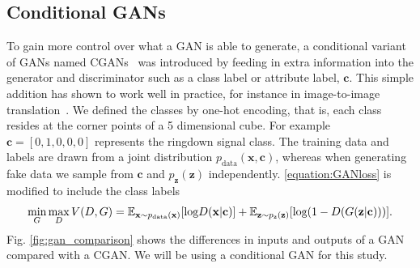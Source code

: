 \documentclass[12pt]{iopart}
\begin{document}
\subsection{Conditional GANs}

%
To gain more control over what a GAN is able to generate, a conditional variant
of \acp{GAN} named \acp{CGAN}~\cite{cgan} was introduced by feeding in extra
information into the generator and discriminator such as a class label or
attribute label, $\mathbf{c}$. This simple addition has shown to work well in practice, for instance in image-to-image translation~\cite{isola2016imagetoimage}. We defined the classes by one-hot encoding, that is, each class resides at the corner points of a 5 dimensional cube. For example $\mathbf{c}=[0,1,0,0,0]$ represents the ringdown signal class. The training data and labels are drawn from a joint distribution $p_{\text{data}}(\mathbf{x},\mathbf{c})$, whereas when generating fake data we sample from $\mathbf{c}$ and $p_{\mathbf{z}}(\mathbf{z})$ independently. \cref{equation:GANloss} is modified to include the class labels 
~
\begin{equation}
   \mathop{\text{min}}_{G}  \mathop{\text{max}}_{D} V(D,G) = \mathbb{E}_{\mathbf{x} \sim p_{\text{\text{data}}}(\mathbf{x})} [\text{log} D(\mathbf{x|c})] + \mathbb{E}_{\mathbf{z} \sim p_{\text{z}}(\mathbf{z})} [\text{log}(1-D(G(\mathbf{z|c})))].
 \label{equation:CGANloss}
 \end{equation}
Fig. \ref{fig:gan_comparison} shows the differences in inputs and outputs of a GAN compared with a \ac{CGAN}. We will be using a conditional GAN for this study.
\end{document}
